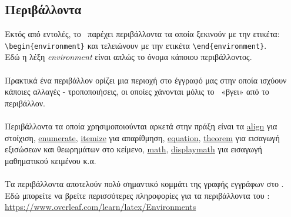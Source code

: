 \documentclass[a4paper, 12pt, oneside, xelatex, final]{article}
\begin{document}
	\subsection{Περιβάλλοντα}
	 \noindent Εκτός από εντολές, το \XeLaTeX\ παρέχει περιβάλλοντα τα οποία ξεκινούν με την ετικέτα:\\
	 \verb+\begin{environment}+ και τελειώνουν με την ετικέτα \verb+\end{environment}+.\\
	 Εδώ η λέξη \emph{environment} είναι απλώς το όνομα κάποιου περιβάλλοντος.\\
	 \\
	 Πρακτικά ένα περιβάλλον ορίζει μια περιοχή στο έγγραφό μας στην οποία ισχύουν κάποιες αλλαγές - τροποποιήσεις, οι οποίες χάνονται μόλις το \XeLaTeX\ «βγει» από το περιβάλλον.\\
	 \\
	 Περιβάλλοντα τα οποία χρησιμοποιούνται αρκετά στην πράξη είναι τα \underline{align} για στοίχιση, \underline{enumerate}, \underline{itemize} για απαρίθμηση, \underline{equation}, \underline{theorem} για εισαγωγή εξισώσεων και θεωρημάτων στο κείμενο, \underline{math}, \underline{displaymath} για εισαγωγή μαθηματικού κειμένου κ.α.\\ \\
	 Τα περιβάλλοντα αποτελούν πολύ σημαντικό κομμάτι της γραφής εγγράφων στο \XeLaTeX.\\
	 Εδώ μπορείτε να βρείτε περισσότερες πληροφορίες για τα περιβάλλοντα του \XeLaTeX:\\
	 \url{https://www.overleaf.com/learn/latex/Environments}
	 
\end{document}
